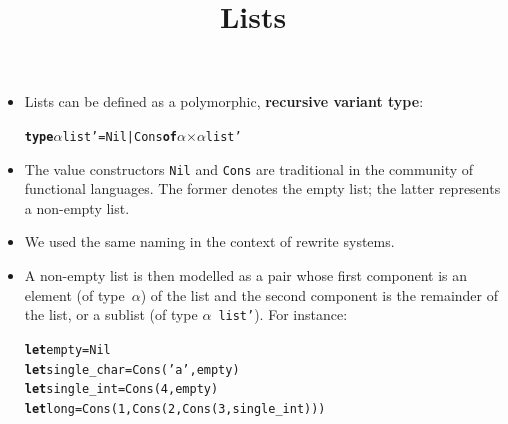 \documentclass[wide]{slides}
\begin{document}
\begin{slide}
  \title{Lists}

  \begin{itemize}

    \item Lists can be defined as a polymorphic, \textbf{recursive
      variant type}:
      \smallskip
\begin{alltt}
\textbf{type} \(\alpha\) list' = Nil | Cons \textbf{of} \(\alpha\) \(\times\) \(\alpha\) list'
\end{alltt}

    \item The value constructors \texttt{Nil} and \texttt{Cons} are
      traditional in the community of functional languages. The former
      denotes the empty list; the latter represents a non\hyp{}empty
      list.

    \item We used the same naming in the context of rewrite systems.

    \item A non\hyp{}empty list is then modelled as a pair whose first
      component is an element (of type~\(\alpha\)) of the list and the
      second component is the remainder of the list, or a sublist (of
      type \(\alpha\)~\texttt{list'}). For instance:
      \smallskip
\begin{alltt}
\textbf{let} empty = Nil
\textbf{let} single\_char = Cons ('a', empty)
\textbf{let} single\_int = Cons (4, empty)
\textbf{let} long = Cons (1, Cons (2, Cons (3, single\_int)))
\end{alltt}

  \end{itemize}

\end{slide}
\end{document}
